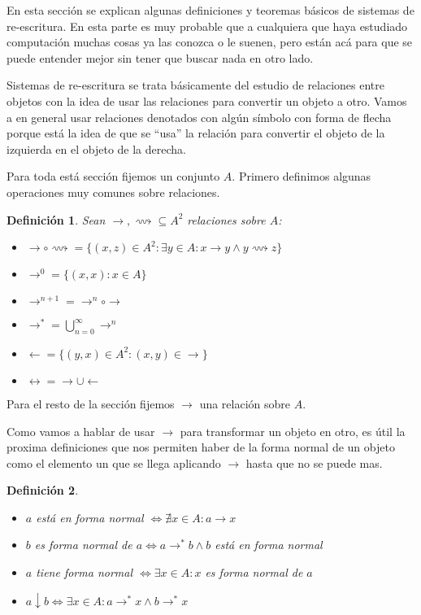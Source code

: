 \documentclass{report}
\theoremstyle{customstyle}
\newtheorem{definition}{Definición}[chapter]
\theoremstyle{factstyle}
\begin{document}
En esta sección se explican algunas definiciones y teoremas básicos de sistemas de re-escritura. En esta parte es muy probable que a cualquiera que haya estudiado computación muchas cosas ya las conozca o le suenen, pero están acá para que se puede entender mejor sin tener que buscar nada en otro lado.

Sistemas de re-escritura se trata básicamente del estudio de relaciones entre objetos con la idea de usar las relaciones para convertir un objeto a otro. Vamos a en general usar relaciones denotados con algún símbolo con forma de flecha porque está la idea de que se ``usa'' la relación para convertir el objeto de la izquierda en el objeto de la derecha.

Para toda está sección fijemos un conjunto $A$. Primero definimos algunas operaciones muy comunes sobre relaciones.

\begin{definition} Sean $→, ⟿ ⊆ A^2$ relaciones sobre $A$:
  \begin{itemize}
    \item $→ ∘ ⟿ = \{(x, z) ∈ A^2 : ∃y ∈ A : x → y ∧ y ⟿ z\}$
    \item $→^0 = \{(x, x) : x ∈ A\}$
    \item $→^{n + 1} = →^n ∘ →$
    \item $→^* = ⋃_{n = 0}^∞ →^n$
    \item $← = \{(y, x) ∈ A^2 : (x, y) ∈ →\}$
    \item $↔ = → ∪ ←$
  \end{itemize}
\end{definition}

Para el resto de la sección fijemos $→$ una relación sobre $A$.

Como vamos a hablar de usar $→$ para transformar un objeto en otro, es útil la proxima definiciones que nos permiten haber de la forma normal de un objeto como el elemento un que se llega aplicando $→$ hasta que no se puede mas.

\begin{definition}\
  \begin{itemize}
    \item $a$ está en forma normal $⇔ ∄x ∈ A : a → x$
    \item $b$ es forma normal de $a ⇔ a →^* b ∧ b$ está en forma normal
    \item $a$ tiene forma normal $⇔ ∃x ∈ A : x$ es forma normal de $a$
    \item $a ↓ b ⇔ ∃x ∈ A : a →^* x ∧ b →^* x$
  \end{itemize}
\end{definition}
\end{document}
